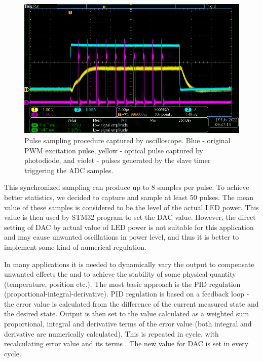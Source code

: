 \begin{figure}[H]
 \centering
 \includegraphics[scale=0.5]{./pictures/PWMSampling.png}
 \caption{Pulse sampling procedure captured by oscilloscope. Blue - original PWM excitation pulse, yellow - optical pulse captured by photodiode, and violet - pulses generated by the slave timer triggering the ADC samples.}
 \label{procedure}
\end{figure}
\par
This synchronized sampling can produce up to 8 samples per pulse. To achieve better statistics, we decided to capture and sample at least 50 pulses. The mean value of these samples is considered to be the level of the actual LED power. This value is then used by STM32 program to set the DAC value. However, the direct setting of DAC by actual value of LED power is not suitable for this application and may cause unwanted oscillations in power level, and thus it is better to implement some kind of numerical regulation.


\par
In many applications it is needed to dynamically vary the output to compensate unwanted effects the and to achieve the stability of some physical quantity (temperature, position etc.). The most basic approach is the PID regulation (proportional-integral-derivative). PID regulation is based on a feedback loop - the error value is calculated from the difference of the current measured state and the desired state. Output is then set to the value calculated as a weighted sum proportional, integral and derivative terms of the error value (both integral and derivative are numerically calculated). This is repeated in cycle, with recalculating error value and its terms \cite{PID}. The new value for DAC is set in every cycle.


